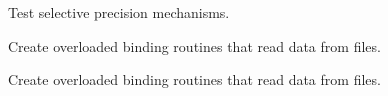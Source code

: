 \begin{DoxyRefList}
Test selective precision mechanisms.  
\item[\label{todo__todo000006}%
\hypertarget{todo__todo000006}{}%
File \hyperlink{mtk__uni__stg__grid__1d_8h}{mtk\+\_\+uni\+\_\+stg\+\_\+grid\+\_\+1d.h} ]Create overloaded binding routines that read data from files.  
\item[\label{todo__todo000009}%
\hypertarget{todo__todo000009}{}%
File \hyperlink{mtk__uni__stg__grid__2d_8h}{mtk\+\_\+uni\+\_\+stg\+\_\+grid\+\_\+2d.h} ]Create overloaded binding routines that read data from files. 
\end{DoxyRefList}